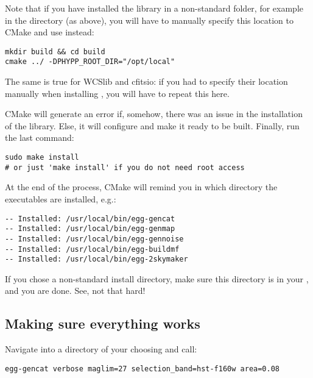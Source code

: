 \begin{enumerate}
Note that if you have installed the \vif library in a non-standard folder, for example in the  directory (as above), you will have to manually specify this location to CMake and use instead:
\begin{verbatim}
mkdir build && cd build
cmake ../ -DPHYPP_ROOT_DIR="/opt/local"
\end{verbatim}
The same is true for WCSlib and cfitsio: if you had to specify their location manually when installing \vif, you will have to repeat this here.

CMake will generate an error if, somehow, there was an issue in the installation of the \vif library. Else, it will configure \egg and make it ready to be built. Finally, run the last command:
\begin{verbatim}
sudo make install
# or just 'make install' if you do not need root access
\end{verbatim}
\end{enumerate}
At the end of the process, CMake will remind you in which directory the \egg executables are installed, e.g.:
\begin{verbatim}
-- Installed: /usr/local/bin/egg-gencat
-- Installed: /usr/local/bin/egg-genmap
-- Installed: /usr/local/bin/egg-gennoise
-- Installed: /usr/local/bin/egg-buildmf
-- Installed: /usr/local/bin/egg-2skymaker
\end{verbatim}
If you chose a non-standard install directory, make sure this directory is in your , and you are done. See, not that hard!

\subsection{Making sure everything works}

Navigate into a directory of your choosing and call:
\begin{verbatim}
egg-gencat verbose maglim=27 selection_band=hst-f160w area=0.08
\end{verbatim}

